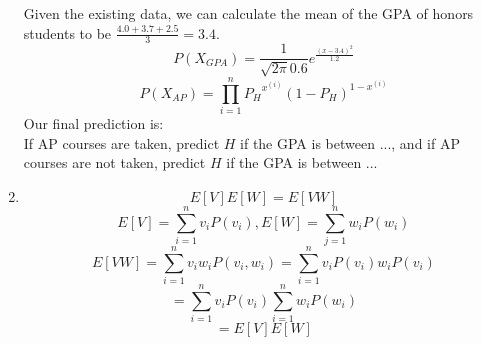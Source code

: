 \documentclass{article}
\begin{document}
\begin{enumerate}
            Given the existing data, we can calculate the mean of the GPA of
            honors students to be $ \frac{4.0 + 3.7 + 2.5}{3} = 3.4 $.
            $$ P( X_{GPA} ) = \frac{1}{\sqrt{2 \pi} 0.6} e^{\frac{(x - 3.4)^2 }{1.2} }$$
            $$ P( X_{AP} ) = \prod\limits_{i = 1}^{n} {P_H}^{x^{(i)}}(1 - P_H)^{1 - x^{(i)}} $$
            Our final prediction is: \\
            If AP courses are taken, predict $H$ if the GPA is between ..., and
            if AP courses are not taken, predict $H$ if the GPA is between ... \\
        \item
            $$ E[V]E[W] = E[VW] $$
            $$ E[V] = \sum_{i = 1}^{n} v_i P(v_i), E[W] = \sum_{j = 1}^{n} w_i P(w_i) $$
            $$ E[VW] = \sum_{i = 1}^{n} v_iw_iP(v_i, w_i) = \sum_{i = 1}^{n} v_iP(v_i)w_iP(v_i)$$
            $$ = \sum_{i = 1}^{n} v_i P(v_i) \sum_{i = 1}^{n} w_i P(w_i) $$
            $$ = E[V]E[W] $$
\end{enumerate}
\end{document}
